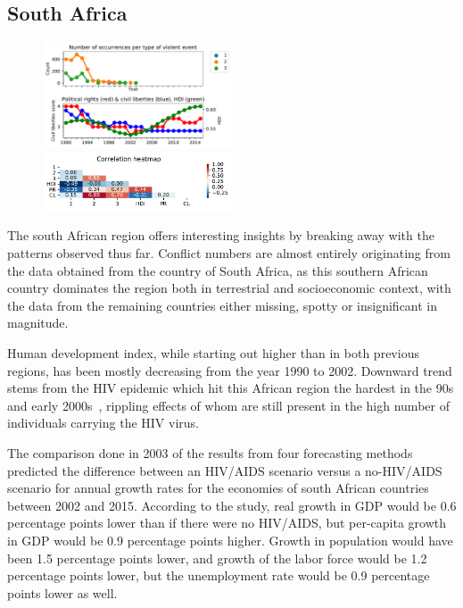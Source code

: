\documentclass[a4paper,11pt]{article}
\begin{document}
\subsection{South Africa}
\begin{figure}[ht!]
    \includegraphics[width=0.50\textwidth]{images/sa.pdf}
    \includegraphics[width=0.50\textwidth]{images/sa_corr.pdf}
\end{figure}

The south African region offers interesting insights by breaking away with the patterns observed thus far. Conflict numbers are almost entirely originating from the data obtained from the country of South Africa, as this southern African country dominates the region both in terrestrial and socioeconomic context, with the data from the remaining countries either missing, spotty or insignificant in magnitude.

Human development index, while starting out higher than in both previous regions, has been mostly decreasing from the year 1990 to 2002. Downward trend stems from the HIV epidemic which hit this African region the hardest in the 90s and early 2000s~\cite{wiki:aids}, rippling effects of whom are still present in the high number of individuals carrying the HIV virus.

The comparison done in 2003 of the results from four forecasting methods predicted the difference between an HIV/AIDS scenario versus a no-HIV/AIDS scenario for annual growth rates for the economies of south African countries between 2002 and 2015. According to the study, real growth in GDP would be 0.6 percentage points lower than if there were no HIV/AIDS, but per-capita growth in GDP would be 0.9 percentage points higher. Growth in population would have been 1.5 percentage points lower, and growth of the labor force would be 1.2 percentage points lower, but the unemployment rate would be 0.9 percentage points lower as well.
\end{document}
